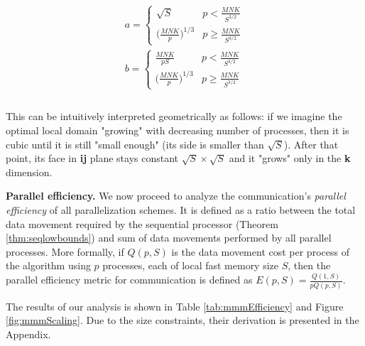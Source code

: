 \documentclass[sigplan,review,anonymous]{acmart}\settopmatter{printfolios=true,printccs=false,printacmref=false}
\newcommand{\macb}[1]{\textbf{\textsf{#1}}}
\begin{document}
\begin{multline}
\\
\nonumber
a =
\begin{cases} 
\sqrt{S} & p < \frac{MNK}{S^{3/2}} \\
\big(\frac{MNK}{p}\big)^{1/3} & p \ge \frac{MNK}{S^{3/2}}
\end{cases}\\
b =
\begin{cases} 
\frac{MNK}{pS} & p < \frac{MNK}{S^{3/2}} \\
\big(\frac{MNK}{p}\big)^{1/3} & p \ge \frac{MNK}{S^{3/2}}
\end{cases}\\
\end{multline}
\\

This can be intuitively interpreted geometrically as follows: if we imagine the 
optimal local domain "growing" with decreasing number of processes, then it is 
cubic until it is still "small enough" (its side is smaller than $\sqrt{S}$). 
After that point, its face in \textbf{ij} plane stays constant $\sqrt{S} \times 
\sqrt{S}$ and it "grows" 
only in the \textbf{k} dimension.

\macb{Parallel efficiency.} We now proceed to analyze the communication's 
\emph{parallel efficiency} of all parallelization schemes. It is defined as a 
ratio between  
the total data movement required by the sequential processor (Theorem 
\ref{thm:seqlowbounds}) and sum of data movements performed by all parallel
processes. More 
formally, if $Q(p,S)$ is the data movement cost per process of the algorithm 
using $p$ 
processes, each of local fast memory size $S$, then the parallel efficiency 
metric for communication is defined as $E(p,S) = \frac{Q(1,S)}{pQ(p,S)}$.

The results of our analysis is shown in Table \ref{tab:mmmEfficiency} and 
Figure \ref{fig:mmmScaling}. Due to the size constraints, their derivation is 
presented in the Appendix.
\end{document}
